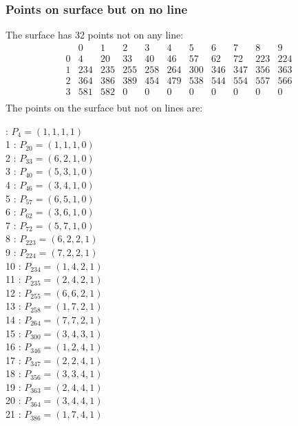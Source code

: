 \documentclass{article}
\begin{document}
{\subsubsection*{Points on surface but on no line}
The surface has 32 points not on any line:\\
$$
\begin{array}{r|*{10}{r}}
 & 0 & 1 & 2 & 3 & 4 & 5 & 6 & 7 & 8 & 9\\
\hline
0 & 4 & 20 & 33 & 40 & 46 & 57 & 62 & 72 & 223 & 224\\
1 & 234 & 235 & 255 & 258 & 264 & 300 & 346 & 347 & 356 & 363\\
2 & 364 & 386 & 389 & 454 & 479 & 538 & 544 & 554 & 557 & 566\\
3 & 581 & 582 & 0 & 0 & 0 & 0 & 0 & 0 & 0 & 0\\
\end{array}
$$
The points on the surface but not on lines are:\\
\begin{multicols}{2}
 : $P_{4}=( 1, 1, 1, 1 )$\\
1 : $P_{20}=( 1, 1, 1, 0 )$\\
2 : $P_{33}=( 6, 2, 1, 0 )$\\
3 : $P_{40}=( 5, 3, 1, 0 )$\\
4 : $P_{46}=( 3, 4, 1, 0 )$\\
5 : $P_{57}=( 6, 5, 1, 0 )$\\
6 : $P_{62}=( 3, 6, 1, 0 )$\\
7 : $P_{72}=( 5, 7, 1, 0 )$\\
8 : $P_{223}=( 6, 2, 2, 1 )$\\
9 : $P_{224}=( 7, 2, 2, 1 )$\\
10 : $P_{234}=( 1, 4, 2, 1 )$\\
11 : $P_{235}=( 2, 4, 2, 1 )$\\
12 : $P_{255}=( 6, 6, 2, 1 )$\\
13 : $P_{258}=( 1, 7, 2, 1 )$\\
14 : $P_{264}=( 7, 7, 2, 1 )$\\
15 : $P_{300}=( 3, 4, 3, 1 )$\\
16 : $P_{346}=( 1, 2, 4, 1 )$\\
17 : $P_{347}=( 2, 2, 4, 1 )$\\
18 : $P_{356}=( 3, 3, 4, 1 )$\\
19 : $P_{363}=( 2, 4, 4, 1 )$\\
20 : $P_{364}=( 3, 4, 4, 1 )$\\
21 : $P_{386}=( 1, 7, 4, 1 )$\\

\end{multicols}}
\end{document}
